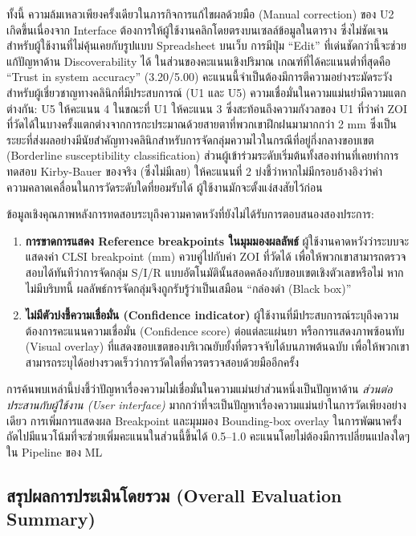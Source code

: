 ทั้งนี้ ความล้มเหลวเพียงครั้งเดียวในภารกิจการแก้ไขผลด้วยมือ (Manual correction) ของ U2 เกิดขึ้นเนื่องจาก Interface ต้องการให้ผู้ใช้งานคลิกโดยตรงบนเซลล์ข้อมูลในตาราง ซึ่งไม่ชัดเจนสำหรับผู้ใช้งานที่ไม่คุ้นเคยกับรูปแบบ Spreadsheet บนเว็บ การมีปุ่ม ``Edit'' ที่เด่นชัดกว่านี้จะช่วยแก้ปัญหาด้าน Discoverability ได้ ในส่วนของคะแนนเชิงปริมาณ เกณฑ์ที่ได้คะแนนต่ำที่สุดคือ ``Trust in system accuracy'' (3.20/5.00) คะแนนนี้จำเป็นต้องมีการตีความอย่างระมัดระวัง สำหรับผู้เชี่ยวชาญทางคลินิกที่มีประสบการณ์ (U1 และ U5) ความเชื่อมั่นในความแม่นยำมีความแตกต่างกัน: U5 ให้คะแนน 4 ในขณะที่ U1 ให้คะแนน 3 ซึ่งสะท้อนถึงความกังวลของ U1 ที่ว่าค่า ZOI ที่วัดได้ในบางครั้งแตกต่างจากการกะประมาณด้วยสายตาที่พวกเขาฝึกฝนมามากกว่า 2 mm ซึ่งเป็นระยะที่ส่งผลอย่างมีนัยสำคัญทางคลินิกสำหรับการจัดกลุ่มความไวในกรณีที่อยู่กึ่งกลางขอบเขต (Borderline susceptibility classification) ส่วนผู้เข้าร่วมระดับเริ่มต้นทั้งสองท่านที่เคยทำการทดสอบ Kirby-Bauer ของจริง (ซึ่งไม่มีเลย) ให้คะแนนที่ 2 บ่งชี้ว่าหากไม่มีกรอบอ้างอิงว่าค่าความคลาดเคลื่อนในการวัดระดับใดที่ยอมรับได้ ผู้ใช้งานมักจะตั้งแง่สงสัยไว้ก่อน

ข้อมูลเชิงคุณภาพหลังการทดสอบระบุถึงความคาดหวังที่ยังไม่ได้รับการตอบสนองสองประการ:
\begin{enumerate}
  \item \textbf{การขาดการแสดง Reference breakpoints ในมุมมองผลลัพธ์}
        ผู้ใช้งานคาดหวังว่าระบบจะแสดงค่า CLSI breakpoint (mm) ควบคู่ไปกับค่า ZOI ที่วัดได้ เพื่อให้พวกเขาสามารถตรวจสอบได้ทันทีว่าการจัดกลุ่ม S/I/R แบบอัตโนมัตินั้นสอดคล้องกับขอบเขตเชิงตัวเลขหรือไม่ หากไม่มีบริบทนี้ ผลลัพธ์การจัดกลุ่มจึงถูกรับรู้ว่าเป็นเสมือน ``กล่องดำ (Black box)''
  \item \textbf{ไม่มีตัวบ่งชี้ความเชื่อมั่น (Confidence indicator)}
        ผู้ใช้งานที่มีประสบการณ์ระบุถึงความต้องการคะแนนความเชื่อมั่น (Confidence score) ต่อแต่ละแผ่นยา หรือการแสดงภาพซ้อนทับ (Visual overlay) ที่แสดงขอบเขตของบริเวณยับยั้งที่ตรวจจับได้บนภาพต้นฉบับ เพื่อให้พวกเขาสามารถระบุได้อย่างรวดเร็วว่าการวัดใดที่ควรตรวจสอบด้วยมืออีกครั้ง
\end{enumerate}

การค้นพบเหล่านี้บ่งชี้ว่าปัญหาเรื่องความไม่เชื่อมั่นในความแม่นยำส่วนหนึ่งเป็นปัญหาด้าน \emph{ส่วนต่อประสานกับผู้ใช้งาน (User interface)} มากกว่าที่จะเป็นปัญหาเรื่องความแม่นยำในการวัดเพียงอย่างเดียว การเพิ่มการแสดงผล Breakpoint และมุมมอง Bounding-box overlay ในการพัฒนาครั้งถัดไปมีแนวโน้มที่จะช่วยเพิ่มคะแนนในส่วนนี้ขึ้นได้ 0.5--1.0 คะแนนโดยไม่ต้องมีการเปลี่ยนแปลงใดๆ ใน Pipeline ของ ML

\subsection{สรุปผลการประเมินโดยรวม (Overall Evaluation Summary)}

